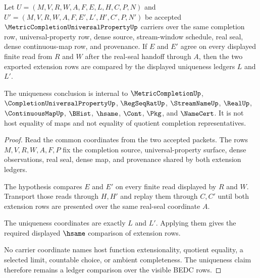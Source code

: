 \begin{theorem}
\label{thm:metric-completion-universal-property-uniqueness-ledger}
Let $U=(M,V,R,W,A,F,E,L,H,C,P,N)$ and $U'=(M,V,R,W,A,F,E',L',H',C',P,N')$ be accepted $\MetricCompletionUniversalPropertyUp$ carriers over the same completion row, universal-property row, dense source, stream-window schedule, real seal, dense continuous-map row, and provenance. If $E$ and $E'$ agree on every displayed finite read from $R$ and $W$ after the real-seal handoff through $A$, then the two exported extension rows are compared by the displayed uniqueness ledgers $L$ and $L'$.

The uniqueness conclusion is internal to $\MetricCompletionUp$, $\CompletionUniversalPropertyUp$, $\RegSeqRatUp$, $\StreamNameUp$, $\RealUp$, $\ContinuousMapUp$, $\BHist$, $\hsame$, $\Cont$, $\Pkg$, and $\NameCert$. It is not host equality of maps and not equality of quotient completion representatives.
\end{theorem}
\begin{proof}
Read the common coordinates from the two accepted packets. The rows $M,V,R,W,A,F,P$ fix the completion source, universal-property surface, dense observations, real seal, dense map, and provenance shared by both extension ledgers.

The hypothesis compares $E$ and $E'$ on every finite read displayed by $R$ and $W$. Transport those reads through $H,H'$ and replay them through $C,C'$ until both extension rows are presented over the same real-seal coordinate $A$.

The uniqueness coordinates are exactly $L$ and $L'$. Applying them gives the required displayed $\hsame$ comparison of extension rows.

No carrier coordinate names host function extensionality, quotient equality, a selected limit, countable choice, or ambient completeness. The uniqueness claim therefore remains a ledger comparison over the visible BEDC rows.
\end{proof}

